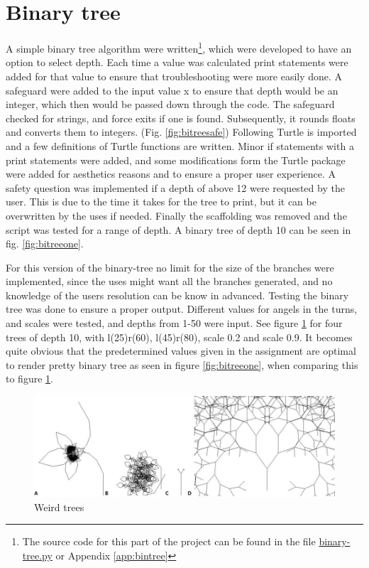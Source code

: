 \documentclass[titlepage]{article}
\begin{document}
\section{Binary tree}
A simple binary tree algorithm were written\footnote{The source code for this part of the project can be found in the file \href{https://github.com/ErikAndersen81/DM550-FractalProject/blob/master/Working_binary_tree.py}{binary-tree.py} or Appendix \ref{app:bintree}}, which were developed to have an option to select depth. Each time a value was calculated print statements were added for that value to ensure that troubleshooting were more easily done.  A safeguard were added to the input value x to ensure that depth would be an integer, which then would be passed down through the code. The safeguard checked for strings, and force exits if one is found. Subsequently, it rounds floats and converts them to integers. (Fig. \ref{fig:bitreesafe})
Following Turtle is imported and a few definitions of Turtle functions are written. 
Minor if statements with a print statements were added, and some modifications form the Turtle package were added for aesthetics reasons and to ensure a proper user experience. A safety question was implemented if a depth of above 12 were requested by the user. This is due to the time it takes for the tree to print, but it can be overwritten by the uses if needed.  Finally the scaffolding was removed and the script was tested for a range of depth. A binary tree of depth 10 can be seen in fig. \ref{fig:bitreeone}. \par
For this version of the binary-tree no limit for the size of the branches were implemented, since the uses might want all the branches generated, and no knowledge of the users resolution can be know in advanced.
Testing the binary tree was done to ensure a proper output. Different values for angels in the turns, and scales were tested, and depths from 1-50 were input. See figure \ref{fig:weirdtree} for four trees of depth 10, with l(25)r(60), l(45)r(80), scale 0.2 and scale 0.9. It becomes quite obvious that the predetermined values given in the assignment are optimal to render pretty binary tree as seen in figure \ref{fig:bitreeone}, when comparing this to figure \ref{fig:weirdtree}.
\begin{figure}[H]
  \centering
  \includegraphics[width=\textwidth]{weirdtree}
  \caption{Weird trees}
  \label{fig:weirdtree}
\end{figure}
\end{document}
